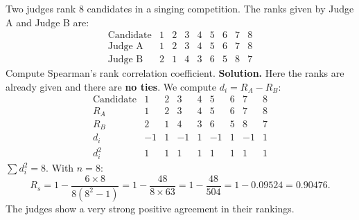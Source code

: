 \documentclass[11pt]{article}
\begin{document}
\begin{exoresolu}
Two judges rank 8 candidates in a singing competition. The ranks given by Judge A and Judge B are:
\[
\begin{array}{c|cccccccc}
\text{Candidate} & 1 & 2 & 3 & 4 & 5 & 6 & 7 & 8 \\ \hline
\text{Judge A} & 1 & 2 & 3 & 4 & 5 & 6 & 7 & 8 \\
\text{Judge B} & 2 & 1 & 4 & 3 & 6 & 5 & 8 & 7
\end{array}
\]
Compute Spearman's rank correlation coefficient.
\tcblower
\textbf{Solution.}
Here the ranks are already given and there are \textbf{no ties}. We compute \(d_i = R_A - R_B\):
\[
\begin{array}{c|cccccccc}
\text{Candidate} & 1 & 2 & 3 & 4 & 5 & 6 & 7 & 8 \\ \hline
R_A & 1 & 2 & 3 & 4 & 5 & 6 & 7 & 8 \\
R_B & 2 & 1 & 4 & 3 & 6 & 5 & 8 & 7 \\
d_i & -1 & 1 & -1 & 1 & -1 & 1 & -1 & 1 \\
d_i^2 & 1 & 1 & 1 & 1 & 1 & 1 & 1 & 1
\end{array}
\]
\(\sum d_i^2 = 8\). With \(n=8\):
\[
R_s = 1 - \frac{6 \times 8}{8(8^2-1)} = 1 - \frac{48}{8 \times 63} = 1 - \frac{48}{504} = 1 - 0.09524 = 0.90476.
\]
The judges show a very strong positive agreement in their rankings.
\end{exoresolu}
\end{document}
